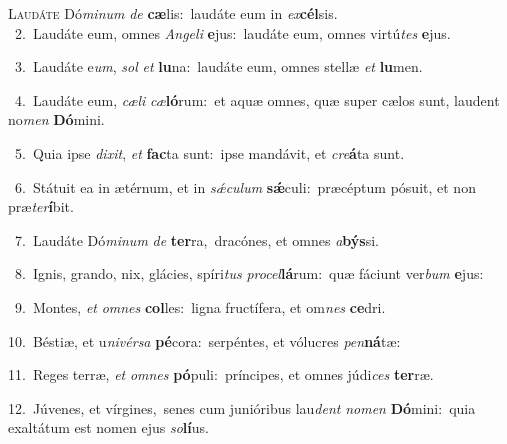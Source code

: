 \lettrine{\initial\textcolor{\initialcolor}{L}}{audáte} Dó\-\textit{mi}\-\textit{num} \textit{de} \textbf{cæ}\-lis:~\star laudáte eum in \textit{ex}\-\textbf{cél}sis.\\
{\numbfont\textcolor{\numbcolor}{~2.}}~Laudáte eum, omnes \textit{An}\-\textit{ge}\textit{li} \textbf{e}\-jus:~\star laudáte eum, omnes virtú\textit{tes} \textbf{e}\-jus.\par
{\numbfont\textcolor{\numbcolor}{~3.}}~Laudáte e\-\textit{um}\-, \textit{sol} \textit{et} \textbf{lu}\-na:~\star laudáte eum, omnes stellæ \textit{et} \textbf{lu}\-men.\par
{\numbfont\textcolor{\numbcolor}{~4.}}~Laudáte eum, \textit{cæ}\-\textit{li} \textit{cæ}\-\textbf{ló}rum:~\star et aquæ omnes, quæ super cælos sunt, laudent no\textit{men} \textbf{Dó}\-mini.\par
{\numbfont\textcolor{\numbcolor}{~5.}}~Quia ipse \textit{di}\-\textit{xit}, \textit{et} \textbf{fac}\-ta sunt:~\star ipse mandávit, et \textit{cre}\-\textbf{á}ta sunt.\par
{\numbfont\textcolor{\numbcolor}{~6.}}~Státuit ea in ætérnum, et in \textit{sǽ}\-\textit{cu}\textit{lum} \textbf{sǽ}\-culi:~\star præcéptum pósuit, et non præ\-\textit{ter}\-\textbf{í}bit.\par
{\numbfont\textcolor{\numbcolor}{~7.}}~Laudáte Dó\-\textit{mi}\-\textit{num} \textit{de} \textbf{ter}\-ra,~\star dracónes, et omnes \textit{a}\-\textbf{býs}si.\par
{\numbfont\textcolor{\numbcolor}{~8.}}~Ignis, grando, nix, glácies, spíri\textit{tus} \textit{pro}\-\textit{cel}\textbf{lá}rum:~\star quæ fáciunt ver\textit{bum} \textbf{e}\-jus:\par
{\numbfont\textcolor{\numbcolor}{~9.}}~Montes, \textit{et} \textit{om}\-\textit{nes} \textbf{col}\-les:~\star ligna fructífera, et om\textit{nes} \textbf{ce}\-dri.\par
{\numbfont\textcolor{\numbcolor}{10.}}~Béstiæ, et u\-\textit{ni}\-\textit{vér}\textit{sa} \textbf{pé}\-cora:~\star serpéntes, et vólucres \textit{pen}\-\textbf{ná}tæ:\par
{\numbfont\textcolor{\numbcolor}{11.}}~Reges terræ, \textit{et} \textit{om}\-\textit{nes} \textbf{pó}\-puli:~\star príncipes, et omnes júdi\textit{ces} \textbf{ter}\-ræ.\par
{\numbfont\textcolor{\numbcolor}{12.}}~Júvenes, et vírgines,~\dagger senes cum junióribus lau\textit{dent} \textit{no}\-\textit{men} \textbf{Dó}\-mini:~\star quia exaltátum est nomen ejus \textit{so}\-\textbf{lí}us.\par
